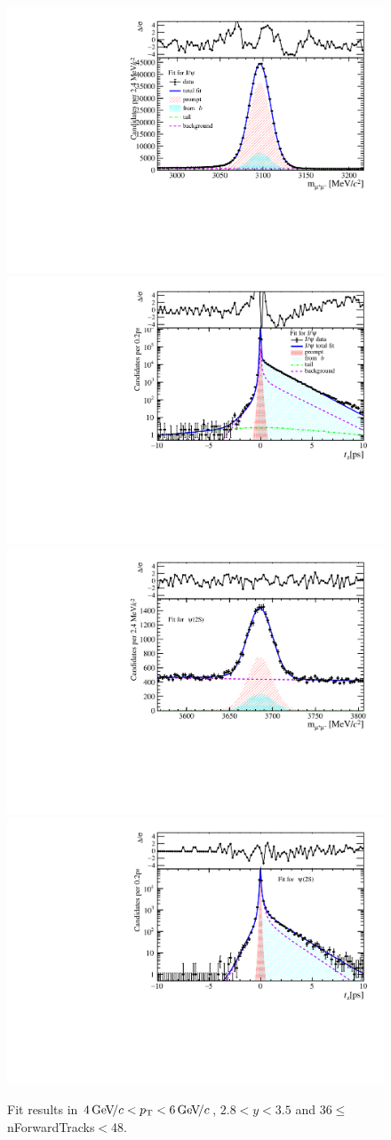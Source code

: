 \begin{figure}[H]
\begin{center}
\includegraphics[width=0.47\linewidth]{pdf/Jpsi/drawmassF/n4y2pt3.pdf}
\includegraphics[width=0.47\linewidth]{pdf/Jpsi/2DFitF/n4y2pt3.pdf}
\vspace*{-0.5cm}
\includegraphics[width=0.47\linewidth]{pdf/Psi2S/drawmassF/n4y2pt3.pdf}
\includegraphics[width=0.47\linewidth]{pdf/Psi2S/2DFitF/n4y2pt3.pdf}
\vspace*{-0.5cm}
\end{center}
\caption{Fit results in $4\text{\,Ge\kern -0.1em V\!/}c<p_{\mathrm{T}}<6\text{\,Ge\kern -0.1em V\!/}c$, $2.8<y<3.5$ and 36$\leq$nForwardTracks$<$48.}
\label{Fitn4y2pt3}
\end{figure}

